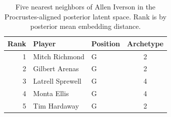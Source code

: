\begin{table}[htbp]
  \centering\small
  \begin{tabular}{rllc}
    \toprule
    Rank & Player & Position & Archetype \\
    \midrule
    1 & Mitch Richmond & G & 2 \\
    2 & Gilbert Arenas & G & 2 \\
    3 & Latrell Sprewell & G & 4 \\
    4 & Monta Ellis & G & 4 \\
    5 & Tim Hardaway & G & 2 \\
    \bottomrule
  \end{tabular}
  \caption{Five nearest neighbors of Allen Iverson in the Procrustes-aligned posterior latent space. Rank is by posterior mean embedding distance.}
  \label{tab:Allen_Iverson_neighbors}
\end{table}

